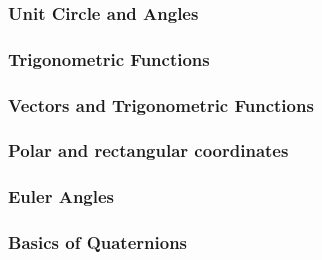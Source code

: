 \subsubsection{Unit Circle and Angles}

\subsubsection{Trigonometric Functions}

\subsubsection{Vectors and Trigonometric Functions}

\subsubsection{Polar and rectangular coordinates}

\subsubsection{Euler Angles}

\subsubsection{Basics of Quaternions}